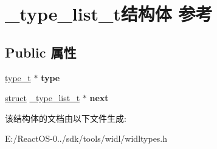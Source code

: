\hypertarget{struct__type__list__t}{}\section{\+\_\+type\+\_\+list\+\_\+t结构体 参考}
\label{struct__type__list__t}
\subsection*{Public 属性}
\begin{DoxyCompactItemize}
\item 
\mbox{\label{struct__type__list__t_ab5d5e65a634349a8e87594b916ffb47c}} 
\hyperlink{struct__type__t}{type\+\_\+t} $\ast$ {\bfseries type}
\item 
\mbox{\label{struct__type__list__t_a5aac9db9830cf3943c8079f8e1402c60}} 
\hyperlink{interfacestruct}{struct} \hyperlink{struct__type__list__t}{\+\_\+type\+\_\+list\+\_\+t} $\ast$ {\bfseries next}
\end{DoxyCompactItemize}


该结构体的文档由以下文件生成\+:\begin{DoxyCompactItemize}
\item 
E\+:/\+React\+O\+S-\/0../sdk/tools/widl/widltypes.\+h\end{DoxyCompactItemize}
